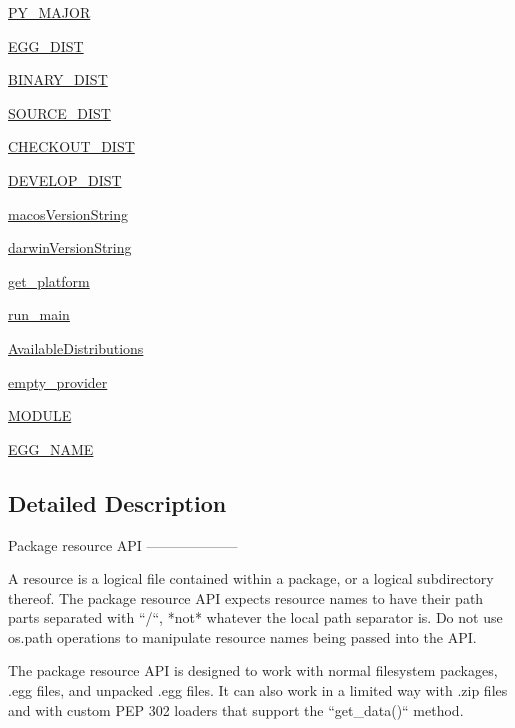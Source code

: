 \begin{DoxyCompactItemize}
\item 
\hyperlink{namespacepkg__resources_a27901fd744697f2b2d55b6f1255cf020}{P\+Y\+\_\+\+M\+A\+J\+OR}
\item 
\hyperlink{namespacepkg__resources_a5a0f6c722896ed99cec71096149b840f}{E\+G\+G\+\_\+\+D\+I\+ST}
\item 
\hyperlink{namespacepkg__resources_ac0716f771522a1d2e9153c5d4b3ae624}{B\+I\+N\+A\+R\+Y\+\_\+\+D\+I\+ST}
\item 
\hyperlink{namespacepkg__resources_aefc29304b85a2e7e1412e963e7e26b68}{S\+O\+U\+R\+C\+E\+\_\+\+D\+I\+ST}
\item 
\hyperlink{namespacepkg__resources_aa866ea6cfcd7406355f9ae7d8a072fef}{C\+H\+E\+C\+K\+O\+U\+T\+\_\+\+D\+I\+ST}
\item 
\hyperlink{namespacepkg__resources_a3accd16ac53c67f4af30a22c9f17cabf}{D\+E\+V\+E\+L\+O\+P\+\_\+\+D\+I\+ST}
\item 
\hyperlink{namespacepkg__resources_a3695a1e24be4d45381a48809b15e13d1}{macos\+Version\+String}
\item 
\hyperlink{namespacepkg__resources_aa2d17171c1a4bc937a48907c530f76ae}{darwin\+Version\+String}
\item 
\hyperlink{namespacepkg__resources_aed6997ba900a5733dcb3ebe4492eaa83}{get\+\_\+platform}
\item 
\hyperlink{namespacepkg__resources_a49c454f5d7f8e48dea964b635ff91968}{run\+\_\+main}
\item 
\hyperlink{namespacepkg__resources_ab2650bbd95cc1c4076b7853c43c97cf9}{Available\+Distributions}
\item 
\hyperlink{namespacepkg__resources_ad4a5f62f100fdb128f15480d4fd2f007}{empty\+\_\+provider}
\item 
\hyperlink{namespacepkg__resources_a084f41f0d9228b901649251a09c6cbdf}{M\+O\+D\+U\+LE}
\item 
\hyperlink{namespacepkg__resources_a1971b341425adaa3e52d5572f7240d8e}{E\+G\+G\+\_\+\+N\+A\+ME}
\end{DoxyCompactItemize}


\subsection{Detailed Description}
\begin{DoxyVerb}Package resource API
--------------------

A resource is a logical file contained within a package, or a logical
subdirectory thereof.  The package resource API expects resource names
to have their path parts separated with ``/``, *not* whatever the local
path separator is.  Do not use os.path operations to manipulate resource
names being passed into the API.

The package resource API is designed to work with normal filesystem packages,
.egg files, and unpacked .egg files.  It can also work in a limited way with
.zip files and with custom PEP 302 loaders that support the ``get_data()``
method.
\end{DoxyVerb}
 

